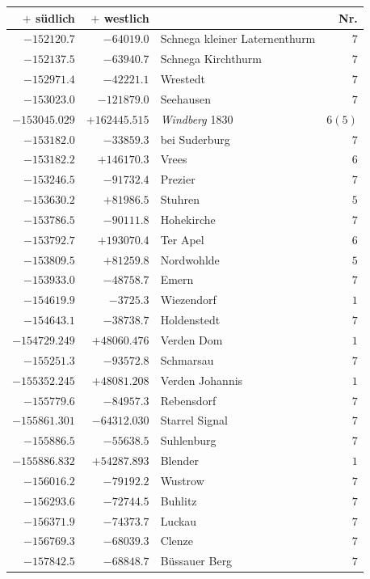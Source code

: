 \begin{center}\begingroup\fontsize{8}{9}\selectfont
\setlength{\tabcolsep}{4pt}
\begin{tabular}{r|r|p{170pt}|r}\hline
\(+\) südlich&\(+\) westlich&&Nr.\\\hline
\(-152120.7\)&\(-64019.0\)&Schnega kleiner Laternenthurm&\(7\)\\
\(-152137.5\)&\(-63940.7\)&Schnega Kirchthurm&\(7\)\\
\(-152971.4\)&\(-42221.1\)&Wrestedt&\(7\)\\
\(-153023.0\)&\(-121879.0\)&Seehausen&\(7\)\\
\(-153045.029\)&\(+162445.515\)&\textit{Windberg} 1830&\(6 (5)\)\\
\(-153182.0\)&\(-33859.3\)&bei Suderburg&\(7\)\\
\(-153182.2\)&\(+146170.3\)&Vrees&\(6\)\\
\(-153246.5\)&\(-91732.4\)&Prezier&\(7\)\\
\(-153630.2\)&\(+81986.5\)&Stuhren&\(5\)\\
\(-153786.5\)&\(-90111.8\)&Hohekirche&\(7\)\\
\(-153792.7\)&\(+193070.4\)&Ter Apel&\(6\)\\
\(-153809.5\)&\(+81259.8\)&Nordwohlde&\(5\)\\
\(-153933.0\)&\(-48758.7\)&Emern&\(7\)\\
\(-154619.9\)&\(-3725.3\)&Wiezendorf&\(1\)\\
\(-154643.1\)&\(-38738.7\)&Holdenstedt&\(7\)\\
\(-154729.249\)&\(+48060.476\)&Verden Dom&\(1\)\\
\(-155251.3\)&\(-93572.8\)&Schmarsau&\(7\)\\
\(-155352.245\)&\(+48081.208\)&Verden Johannis&\(1\)\\
\(-155779.6\)&\(-84957.3\)&Rebensdorf&\(7\)\\
\(-155861.301\)&\(-64312.030\)&Starrel Signal&\(7\)\\
\(-155886.5\)&\(-55638.5\)&Suhlenburg&\(7\)\\
\(-155886.832\)&\(+54287.893\)&Blender&\(1\)\\
\(-156016.2\)&\(-79192.2\)&Wustrow&\(7\)\\
\(-156293.6\)&\(-72744.5\)&Buhlitz&\(7\)\\
\(-156371.9\)&\(-74373.7\)&Luckau&\(7\)\\
\(-156769.3\)&\(-68039.3\)&Clenze&\(7\)\\
\(-157842.5\)&\(-68848.7\)&Büssauer Berg&\(7\)\\

\end{tabular}
\end{center}

